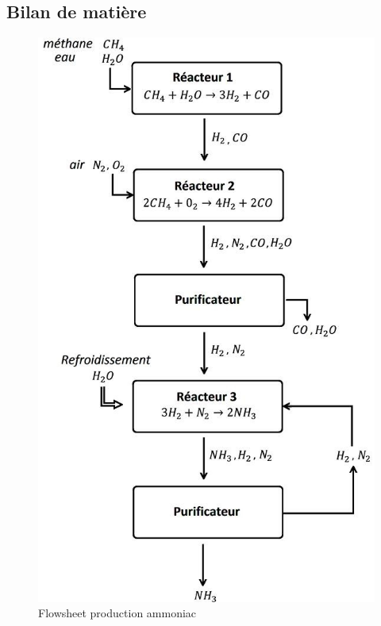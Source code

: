 \documentclass[11pt,a4paper]{report}
\begin{document}
\subsection*{Bilan de matière}
\begin{figure}[ht!]
 \centering
 \includegraphics[scale=0.35]{flowsheet.jpg}
 \caption{Flowsheet production ammoniac}
 \label{scheme}
 
\end{figure}
\end{document}
